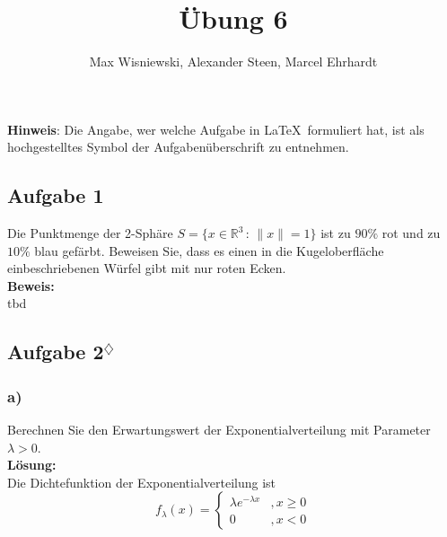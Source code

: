 \documentclass[11pt,a4paper,ngerman]{article}
\date{}
\title{Übung 6}
\author{Max Wisniewski\maxw, Alexander Steen\alex, Marcel Ehrhardt\marcel}
\newcommand{\marcel}{$^\diamondsuit$}
\begin{document}

\renewcommand{\figurename}{Figure}

\maketitle
\thispagestyle{fancy}

\begin{center}
\textbf{Hinweis}: Die Angabe, wer welche Aufgabe in \LaTeX\ formuliert hat, ist als hochgestelltes Symbol der Aufgabenüberschrift zu entnehmen.
\end{center}


\subsection*{Aufgabe 1}

Die Punktmenge der 2-Sphäre $S = \{ x \in \mathbb{R}^3 \, : \, \|x\| = 1\}$ ist zu $90\%$ rot und zu $10\%$ blau gefärbt. Beweisen Sie,
dass es einen in die Kugeloberfläche einbeschriebenen Würfel gibt mit nur roten Ecken.\\

\textbf{Beweis:}\\

tbd

\subsection*{Aufgabe 2\marcel}

\subsubsection*{a)}

Berechnen Sie den Erwartungswert der Exponentialverteilung mit Parameter $\lambda > 0$.\\

\textbf{Lösung:}\\

Die Dichtefunktion der Exponentialverteilung ist
\[
    f_\lambda (x) = \left\{ \begin{array}{rl} \lambda e^{-\lambda x} &, x\geq 0 \\ 0 &, x < 0 \end{array} \right.
\]
\end{document}
